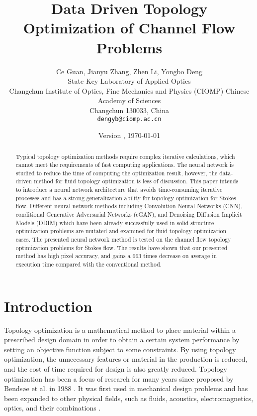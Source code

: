 \documentclass{article}
\title{Data Driven Topology Optimization of Channel Flow Problems
}
\author{
  Ce Guan, Jianyu Zhang, Zhen Li, Yongbo Deng \\
  State Key Laboratory of Applied Optics \\
  Changchun Institute of Optics, Fine Mechanics and Physics (CIOMP) Chinese Academy of Sciences \\
  Changchun 130033, China\\
  \texttt{dengyb@ciomp.ac.cn} \\
}
\begin{document}
\maketitle


\begin{abstract}
Typical topology optimization methods require complex iterative calculations, which cannot meet the requirements of fast computing applications. The neural network is studied to reduce the time of computing the optimization result, however, the data-driven method for fluid topology optimization is less of discussion. This paper intends to introduce a neural network architecture that avoids time-consuming iterative processes and has a strong generalization ability for topology optimization for Stokes flow. Different neural network methods including Convolution Neural Networks (CNN), conditional Generative Adversarial Networks (cGAN), and Denoising Diffusion Implicit Models (DDIM) which have been already successfully used in solid structure optimization problems are mutated and examined for fluid topology optimization cases. The presented neural network method is tested on the channel flow topology optimization problems for Stokes flow. The results have shown that our presented method has high pixel accuracy, and gains a 663 times decrease on average in execution time compared with the conventional method.
\end{abstract}


\date{Version \versionno, \today}

\maketitle %


\section{Introduction}

Topology optimization is a mathematical method to place material within a prescribed design domain in order to obtain a certain system performance by setting an objective function subject to some constraints\cite{Intro-1-browne2013topology}.  By using topology optimization, the unnecessary features or material in the production is reduced, and the cost of time required for design is also greatly reduced. Topology optimization has been a focus of research for many years since proposed by Bendsøe et al. in 1988 \cite{9-1-bendsoe1988generating}.  It was first used in mechanical design problems and has been expanded to other physical fields, such as fluids, acoustics, electromagnetics, optics, and their combinations \cite{9-2-sigmund2013topology}.
\end{document}
